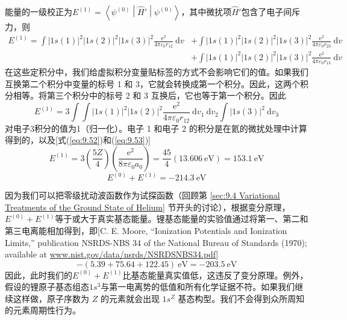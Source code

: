     能量的一级校正为$E^{\left(1\right)} = \left\langle \psi^{\left(0\right)} \middle| \hat{H}' \middle| \psi^{\left(0\right)} \right\rangle$，其中微扰项$\hat{H}'$包含了电子间斥力，则
    \begin{equation*}
        \begin{aligned}
            E^{\left(1\right)} = \int \left|1s\left(1\right)\right|^2 \left|1s\left(2\right)\right|^2 \left|1s\left(3\right)\right|^2 \frac{\mathrm{e}^2}{4\pi\varepsilon_0 r_{12}} \:\mathrm{d}v &+ \int \left|1s\left(1\right)\right|^2 \left|1s\left(2\right)\right|^2 \left|1s\left(3\right)\right|^2 \frac{\mathrm{e}^2}{4\pi\varepsilon_0 r_{23}} \:\mathrm{d}v \\
            &+ \int \left|1s\left(1\right)\right|^2 \left|1s\left(2\right)\right|^2 \left|1s\left(3\right)\right|^2 \frac{\mathrm{e}^2}{4\pi\varepsilon_0 r_{13}} \:\mathrm{d}v
        \end{aligned}
    \end{equation*}
    在这些定积分中，我们给虚拟积分变量贴标签的方式不会影响它们的值。如果我们互换第二个积分中变量的标号 1 和 3，它就会转换成第一个积分。因此，这两个积分相等。将第三个积分中的标号 2 和 3 互换后，它也等于第一个积分。因此
    \begin{equation*}
        E^{\left(1\right)} = 3 \int \int \left|1s\left(1\right)\right|^2 \left|1s\left(2\right)\right|^2 \frac{\mathrm{e}^2}{4\pi \varepsilon_0 r_{12}} \:\mathrm{d}v_1\: \mathrm{d}v_2 \int \left|1s\left(3\right)\right|^2 \:\mathrm{d}v_3
    \end{equation*}
    对电子3积分的值为1（归一化）。电子 1 和电子 2 的积分是在氦的微扰处理中计算得到的，以及[式(\ref{eq:9.52})和(\ref{eq:9.53})]
    \begin{equation*}
        E^{\left(1\right)} = 3\left(\frac{5Z}{4}\right)\left(\frac{\mathrm{e}^2}{8\pi \varepsilon_0a_0}\right) = \frac{45}{4} \left(13.606 \: \mathrm{eV}\right) = 153.1 \: \mathrm{eV}
    \end{equation*}
    \begin{equation*}
        E^{\left(0\right)} + E^{\left(1\right)} = -214.3 \: \mathrm{eV}
    \end{equation*}

    因为我们可以把零级扰动波函数作为试探函数（回顾第 \ref{sec:9.4 Variational Treatments of the Ground State of Helium} 节开头的讨论），根据变分原理，$E^{\left(0\right)} + E^{\left(1\right)}$等于或大于真实基态能量。锂基态能量的实验值通过将第一、第二和第三电离能相加得到，即[C. E. Moore, “Ionization Potentials and Ionization Limits,” publication NSRDS-NBS 34 of the National Bureau of Standards (1970); available at \url{www.nist.gov/data/nsrds/NSRDSNBS34.pdf}]
    \begin{equation*}
        -\left(5.39 + 75.64 + 122.45\right) \: \mathrm{eV} = -203.5 \: \mathrm{eV}
    \end{equation*}
    因此，此时我们的$E^{\left(0\right)} + E^{\left(1\right)}$比基态能量真实值低，这违反了变分原理。例外，假设的锂原子基态组态$1s^3$与第一电离势的低值和所有化学证据不符。如果我们继续这样做，原子序数为 $Z$ 的元素就会出现 $1s^Z$ 基态构型。我们不会得到众所周知的元素周期性行为。

